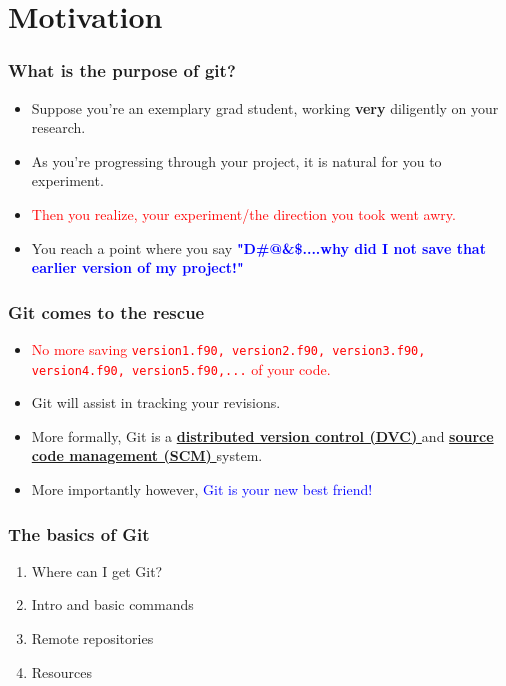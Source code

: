 \section{
  Motivation
}
%
%
\begin{frame}
	\frametitle{
	What is the purpose of git?
	}
	\begin{itemize}%
	\item
          Suppose you're an exemplary grad student, working {\bf very} diligently on your research.
        \item
          As you're progressing through your project, it is natural for you to experiment.
        \item
          \textcolor{red}{Then you realize, your experiment/the direction you took went awry.}
        \item
          You reach a point where you say \textcolor{blue}{\bf "D\#@\&\$....why did I not save that earlier version of my project!"}
	\end{itemize}
\end{frame}
%
%
\begin{frame}[fragile]
	\frametitle{
	Git comes to the rescue
	}
	\begin{itemize}%
	\item
          \textcolor{red}{
            No more saving {\tt version1.f90, version2.f90, version3.f90, version4.f90, version5.f90,...} of your code.
          }
        \item
          Git will assist in tracking your revisions. 
	\item
          More formally, Git is a \href{
            http://en.wikipedia.org/wiki/Distributed\_revision\_control}{
            \bf distributed version control (DVC)
          }
          and \href{
            http://en.wikipedia.org/wiki/Revision\_control}{
            \bf source code management (SCM)
          } system.
        \item
          More importantly however, \textcolor{blue}{Git is your new best friend!}
	\end{itemize}
\end{frame}
%
%
\begin{frame}
  \frametitle{
    \bf The basics of Git
  }
  \begin{enumerate}%
  \item
    Where can I get Git?
  \item
    Intro and basic commands
  \item
    Remote repositories
  \item
    Resources
  \end{enumerate}
\end{frame}
